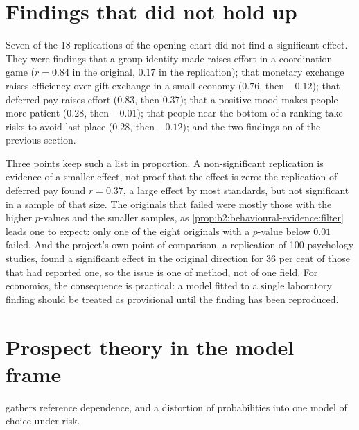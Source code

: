 \section{Findings that did not hold up}\label{sec:b2:behavioural-evidence:failures}

Seven of the 18 replications of the opening chart did not find a significant effect. They were findings
that a group identity made  raises effort in a coordination game ($r = 0.84$ in the original,
$0.17$ in the replication); that monetary exchange raises efficiency over gift exchange in a small
economy ($0.76$, then $-0.12$); that deferred pay raises effort ($0.83$, then $0.37$); that a positive
mood makes people more patient ($0.28$, then $-0.01$); that people near the bottom of a ranking take
risks to avoid last place ($0.28$, then $-0.12$); and the two findings on  of the
previous section.

Three points keep such a list in proportion. A non-significant replication is evidence of a smaller
effect, not proof that the effect is zero: the replication of deferred pay found $r = 0.37$, a large
effect by most standards, but not significant in a sample of that size. The originals that failed
were mostly those with the higher $p$-values and the smaller samples, as
\cref{prop:b2:behavioural-evidence:filter} leads one to expect: only one of the eight originals with a
$p$-value below $0.01$ failed. And the project's own point of comparison, a replication of 100
psychology studies, found a significant effect in the original direction for 36 per cent of those that
had reported one, so the issue is one of method, not of one field. For economics, the consequence is practical: a model
fitted to a single laboratory finding should be treated as provisional until the finding has been
reproduced.

\section{Prospect theory in the model frame}\label{sec:b2:behavioural-evidence:prospect-theory}

 gathers reference dependence,  and a distortion of probabilities into one
model of choice under risk.

